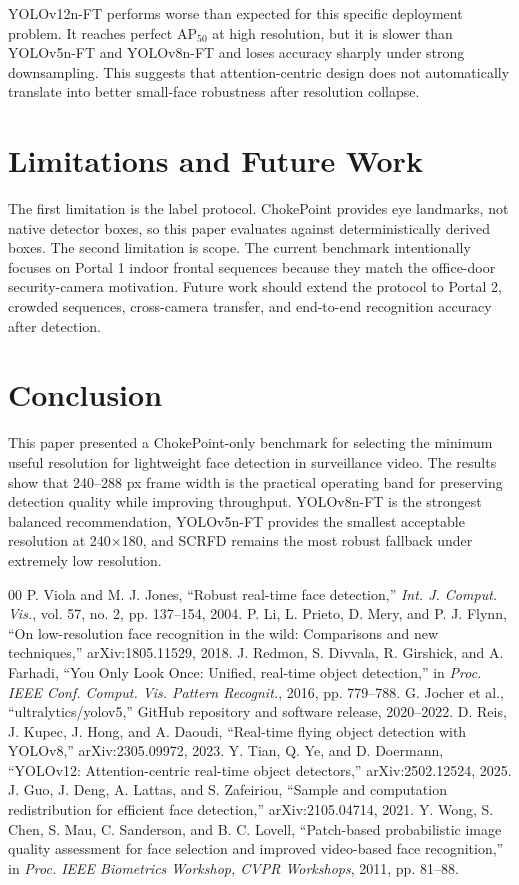 \documentclass[conference]{IEEEtran}
\begin{document}
YOLOv12n-FT performs worse than expected for this specific deployment problem. It reaches perfect AP$_{50}$ at high resolution, but it is slower than YOLOv5n-FT and YOLOv8n-FT and loses accuracy sharply under strong downsampling. This suggests that attention-centric design does not automatically translate into better small-face robustness after resolution collapse.

\section{Limitations and Future Work}
The first limitation is the label protocol. ChokePoint provides eye landmarks, not native detector boxes, so this paper evaluates against deterministically derived boxes. The second limitation is scope. The current benchmark intentionally focuses on Portal 1 indoor frontal sequences because they match the office-door security-camera motivation. Future work should extend the protocol to Portal 2, crowded sequences, cross-camera transfer, and end-to-end recognition accuracy after detection.

\section{Conclusion}
This paper presented a ChokePoint-only benchmark for selecting the minimum useful resolution for lightweight face detection in surveillance video. The results show that 240--288 px frame width is the practical operating band for preserving detection quality while improving throughput. YOLOv8n-FT is the strongest balanced recommendation, YOLOv5n-FT provides the smallest acceptable resolution at 240$\times$180, and SCRFD remains the most robust fallback under extremely low resolution.

\begin{thebibliography}{00}
 P. Viola and M. J. Jones, ``Robust real-time face detection,'' \textit{Int. J. Comput. Vis.}, vol. 57, no. 2, pp. 137--154, 2004.
 P. Li, L. Prieto, D. Mery, and P. J. Flynn, ``On low-resolution face recognition in the wild: Comparisons and new techniques,'' arXiv:1805.11529, 2018.
 J. Redmon, S. Divvala, R. Girshick, and A. Farhadi, ``You Only Look Once: Unified, real-time object detection,'' in \textit{Proc. IEEE Conf. Comput. Vis. Pattern Recognit.}, 2016, pp. 779--788.
 G. Jocher et al., ``ultralytics/yolov5,'' GitHub repository and software release, 2020--2022.
 D. Reis, J. Kupec, J. Hong, and A. Daoudi, ``Real-time flying object detection with YOLOv8,'' arXiv:2305.09972, 2023.
 Y. Tian, Q. Ye, and D. Doermann, ``YOLOv12: Attention-centric real-time object detectors,'' arXiv:2502.12524, 2025.
 J. Guo, J. Deng, A. Lattas, and S. Zafeiriou, ``Sample and computation redistribution for efficient face detection,'' arXiv:2105.04714, 2021.
 Y. Wong, S. Chen, S. Mau, C. Sanderson, and B. C. Lovell, ``Patch-based probabilistic image quality assessment for face selection and improved video-based face recognition,'' in \textit{Proc. IEEE Biometrics Workshop, CVPR Workshops}, 2011, pp. 81--88.
\end{thebibliography}
\end{document}
